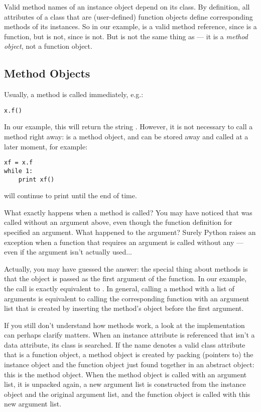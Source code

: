 \documentclass{manual}
\begin{document}
Valid method names of an instance object depend on its class.  By
definition, all attributes of a class that are (user-defined) function 
objects define corresponding methods of its instances.  So in our
example,  is a valid method reference, since
 is a function, but  is not, since
 is not.  But  is not the same thing as
 --- it is a \emph{method object}, not a function
object.%


\subsection{Method Objects}
\label{methodObjects}

Usually, a method is called immediately, e.g.:

\begin{verbatim}
x.f()
\end{verbatim}

In our example, this will return the string .
However, it is not necessary to call a method right away: 
is a method object, and can be stored away and called at a later
moment, for example:

\begin{verbatim}
xf = x.f
while 1:
    print xf()
\end{verbatim}

will continue to print  until the end of time.

What exactly happens when a method is called?  You may have noticed
that  was called without an argument above, even though
the function definition for  specified an argument.  What
happened to the argument?  Surely Python raises an exception when a
function that requires an argument is called without any --- even if
the argument isn't actually used...

Actually, you may have guessed the answer: the special thing about
methods is that the object is passed as the first argument of the
function.  In our example, the call  is exactly equivalent
to .  In general, calling a method with a list of
 arguments is equivalent to calling the corresponding function
with an argument list that is created by inserting the method's object
before the first argument.

If you still don't understand how methods work, a look at the
implementation can perhaps clarify matters.  When an instance
attribute is referenced that isn't a data attribute, its class is
searched.  If the name denotes a valid class attribute that is a
function object, a method object is created by packing (pointers to)
the instance object and the function object just found together in an
abstract object: this is the method object.  When the method object is
called with an argument list, it is unpacked again, a new argument
list is constructed from the instance object and the original argument
list, and the function object is called with this new argument list.
\end{document}
